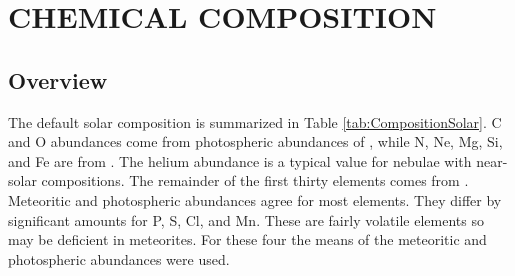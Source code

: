 \chapter{CHEMICAL COMPOSITION}

\section{Overview}

The default solar composition is summarized in Table
\ref{tab:CompositionSolar}.  C and O abundances come from photospheric
abundances of \citet{Allende2002,Allende2001}, while N, Ne, Mg, Si,
and Fe are from \citet{Holweger2001}.  The helium abundance is a
typical value for nebulae with near-solar compositions.  The remainder
of the first thirty elements comes from \citet{Grevesse1998}.
Meteoritic and photospheric abundances agree for most elements.  They
differ by significant amounts for P, S, Cl, and Mn.  These are fairly
volatile elements so may be deficient in meteorites.  For these four
the means of the meteoritic and photospheric abundances were used.


